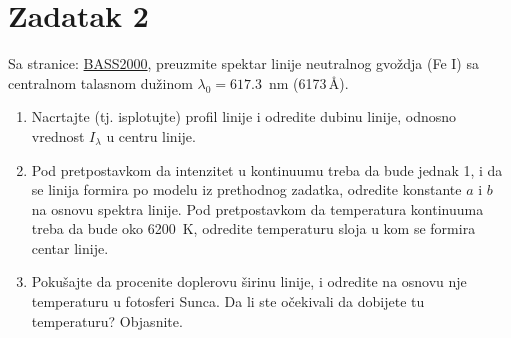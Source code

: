 \documentclass[12pt]{article}
\begin{document}
\section*{Zadatak 2}

Sa stranice: \href{https://bass2000.obspm.fr/solar_spect.php}{BASS2000}, preuzmite spektar linije neutralnog gvo\v{z}dja (Fe I) sa centralnom talasnom du\v{z}inom $\lambda_0=617.3$~nm (6173\,\AA). 

\begin{enumerate}
    
    \item Nacrtajte (tj. isplotujte) profil linije i odredite dubinu linije, odnosno vrednost $I_\lambda$ u centru linije. 

    \item Pod pretpostavkom da intenzitet u kontinuumu treba da bude jednak 1, i da se linija formira po modelu iz prethodnog zadatka, odredite konstante $a$ i $b$ na osnovu spektra linije. Pod pretpostavkom da temperatura kontinuuma treba da bude oko 6200~K, odredite temperaturu sloja u kom se formira centar linije. 
    
    \item Poku\v{s}ajte da procenite doplerovu \v{s}irinu linije, i odredite na osnovu nje temperaturu u fotosferi Sunca. Da li ste o\v{c}ekivali da dobijete tu temperaturu? Objasnite.

\end{enumerate}
\end{document}
